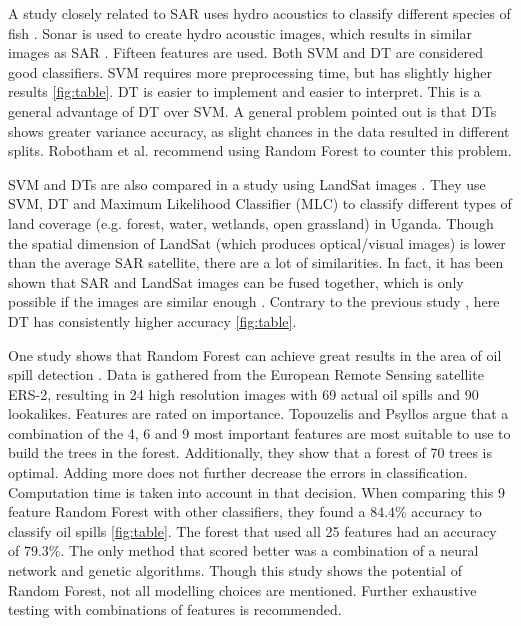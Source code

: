 A study closely related to SAR uses hydro acoustics to classify different species of fish \cite{Robotham2011170}. Sonar is used to create hydro acoustic images, which results in similar images as SAR \cite{griffiths2003synthetic}. Fifteen features are used. Both SVM and DT are considered good classifiers. SVM requires more preprocessing time, but has slightly higher results \ref{fig:table}. DT is easier to implement and easier to interpret. This is a general advantage of DT over SVM. A general problem pointed out is that DTs shows greater variance accuracy, as slight chances in the data resulted in different splits. Robotham et al. recommend using Random Forest to counter this problem.

SVM and DTs are also compared in a study using LandSat images \cite{Otukei2010S27}. They use SVM, DT and Maximum Likelihood Classifier (MLC) to classify different types of land coverage (e.g. forest, water, wetlands, open grassland) in Uganda. Though the spatial dimension of LandSat (which produces optical/visual images) is lower than the average SAR satellite, there are a lot of similarities. In fact, it has been shown that SAR and LandSat images can be fused together, which is only possible if the images are similar enough \cite{dupas2000sar}. Contrary to the previous study \cite{Robotham2011170}, here DT has consistently higher accuracy \ref{fig:table}.

One study shows that Random Forest can achieve great results in the area of oil spill detection \cite{Topouzelis201268}. Data is gathered from the European Remote Sensing satellite ERS-2, resulting in 24 high resolution images with 69 actual oil spills and 90 lookalikes. Features are rated on importance. Topouzelis and Psyllos argue that a combination of the 4, 6 and 9 most important features \cite{topouzelis2003oil} are most suitable to use to build the trees in the forest. Additionally, they show that a forest of 70 trees is optimal. Adding more does not further decrease the errors in classification. Computation time is taken into account in that decision. When comparing this 9 feature Random Forest with other classifiers, they found a $84.4$\% accuracy to classify oil spills \ref{fig:table}. The forest that used all 25 features had an accuracy of $79.3$\%. The only method that scored better was a combination of a neural network and genetic algorithms. Though this study shows the potential of Random Forest, not all modelling choices are mentioned. Further exhaustive testing with combinations of features is recommended.

